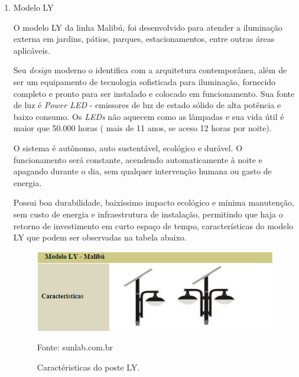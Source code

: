 \begin{enumerate}
	\item Modelo LY
	
	  O modelo  LY  da linha Malibú, foi desenvolvido para atender a iluminação externa em jardins, pátios, parques, estacionamentos, entre outras áreas aplicáveis.
	  
	Seu \textit{design} moderno o identifica com a arquitetura contemporânea, além de ser um equipamento de tecnologia sofisticada para iluminação, fornecido completo e pronto para ser instalado e colocado em funcionamento. Sua fonte de luz é \textit{Power LED} - emissores de luz de estado sólido de alta potência e baixo consumo. Os \textit{LEDs} não aquecem como as lâmpadas e sua vida útil é maior que 50.000 horas ( mais de 11 anos, se aceso 12 horas por noite). \cite{SUNLAB}
    
    O sistema é autônomo, auto sustentável, ecológico e durável. O funcionamento será constante, acendendo automaticamente à noite e apagando durante o dia, sem qualquer intervenção humana ou gasto de energia.
    
    Possui boa durabilidade, baixíssimo impacto ecológico e mínima manutenção, sem custo de energia e infraestrutura de instalação, permitindo que haja o retorno de investimento em curto espaço de tempo, características do modelo LY  que podem ser observadas na tabela abaixo.

	\begin{figure}[H]
	 \centering
	\label{Caractéristicas do poste LY}
	 \includegraphics[keepaspectratio=true,scale=0.8]{postes/tabelaLY.png}
	 \caption{Caractéristicas do poste LY.}
	 \small{Fonte: sunlab.com.br}
	\end{figure}



\end{enumerate}
